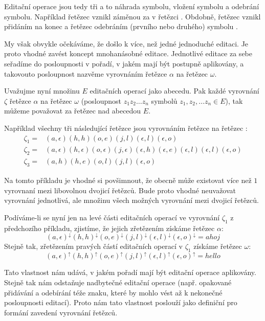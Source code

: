 \documentclass[a4paper,10pt]{article}
\begin{document}
Editační operace jsou tedy tři a to náhrada symbolu, vložení symbolu a odebrání symbolu. Například řetězec  vznikl záměnou  za  v řetězci . Obdobně, řetězec  vznikl přidáním  na konec a řetězec  odebráním (prvního nebo druhého) symbolu .

My však obvykle očekáváme, že došlo k více, než jedné jednoduché editaci. Je proto vhodné zavést koncept mnohanásobné editace. Jednotlivé editace za sebe seřadíme do posloupnosti v pořadí, v jakém mají být postupně aplikovány, a takovouto posloupnost nazvěme vyrovnáním řetězce $\alpha$ na řetězec $\omega$.

Uvažujme nyní množinu $E$ editačních operací jako abecedu. Pak každé vyrovnání $\zeta$ řetězce $\alpha$ na řetězec $\omega$ (posloupnost $z_1 z_2 \dots z_n$ symbolů $z_1, z_2, \dots z_n \in E$), tak můžeme považovat za řetězec nad abecedou $E$.


Například všechny tři následující řetězce jsou vyrovnáním řetězce  na řetězec :
\begin{align*}
 \zeta_1 =& (a,\epsilon) (h,h) (o, e) (j, l) (\epsilon, l) (\epsilon, o) \\
 \zeta_2 =& (a, \epsilon) (h, \epsilon) (o, \epsilon) (j, \epsilon) (\epsilon, h) (\epsilon, e) (\epsilon, l) (\epsilon, l) (\epsilon, o) \\
 \zeta_3 =& (a,h) (h,e) (o,l) (j,l) (\epsilon, o) 
\end{align*}

Na tomto příkladu je vhodné si povšimnout, že obecně může existovat více než $1$ vyrovnaní mezi libovolnou dvojicí řetězců. Bude proto vhodné neuvažovat vyrovnání jednotlivá, ale množinu všech možných vyrovnání mezi dvojicí řetězců. 

Podíváme-li se nyní jen na levé části editačních operací ve vyrovnání $\zeta_1$ z předchozího příkladu, zjistíme, že jejich zřetězením získáme řetězec $\alpha$:
$$
(a,\epsilon)^\downarrow (h,h)^\downarrow  (o, e)^\downarrow  (j, l)^\downarrow  (\epsilon, l)^\downarrow  (\epsilon, o)^\downarrow  = ahoj
$$
Stejně tak, zřetězením pravých částí editačních operací v $\zeta_1$ získáme řetězec $\omega$:
$$
(a,\epsilon)^\uparrow (h,h)^\uparrow  (o, e)^\uparrow  (j, l)^\uparrow  (\epsilon, l)^\uparrow  (\epsilon, o)^\uparrow  = hello
$$

Tato vlastnost nám udává, v jakém pořadí mají být editační operace aplikovány. Stejně tak nám odstaňuje nadbytečné editační operace (např. opakované přidávání a odebírání téže znaku, které by mohlo vést až k nekonečné posloupnosti editací). Proto nám tato vlastnost poslouží jako definiční pro formání zavedení vyrovnání řetězců.
\end{document}
